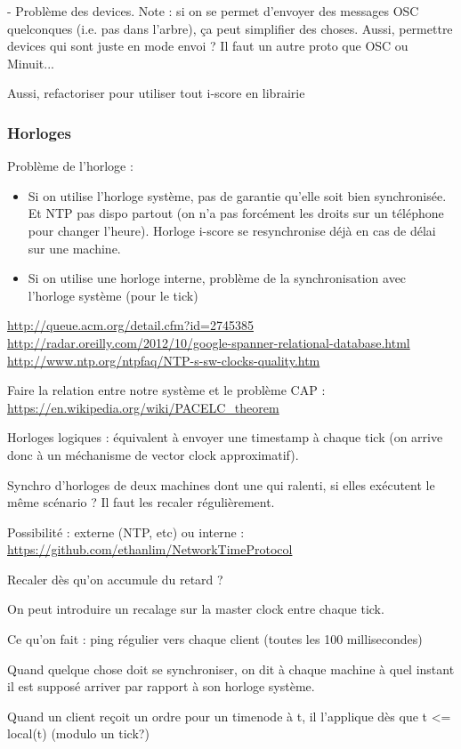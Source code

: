 \documentclass{article}
\begin{document}
- Problème des devices. Note : si on se permet d'envoyer des messages OSC quelconques (i.e. pas dans l'arbre), ça peut simplifier des choses. Aussi, permettre devices qui sont juste en mode envoi ? Il faut un autre proto que OSC ou Minuit...

Aussi, refactoriser pour utiliser tout i-score en librairie

\subsubsection{Horloges}
Problème de l'horloge : 
\begin{itemize}
\item Si on utilise l'horloge système, pas de garantie qu'elle soit bien synchronisée. 
Et NTP pas dispo partout (on n'a pas forcément les droits sur un téléphone pour changer l'heure).
Horloge i-score se resynchronise déjà en cas de délai sur une machine.
\item Si on utilise une horloge interne, problème de la synchronisation avec l'horloge système (pour le tick)
\end{itemize}

\url{http://queue.acm.org/detail.cfm?id=2745385}
\url{http://radar.oreilly.com/2012/10/google-spanner-relational-database.html}
\url{http://www.ntp.org/ntpfaq/NTP-s-sw-clocks-quality.htm}

Faire la relation entre notre système et le problème CAP : \url{https://en.wikipedia.org/wiki/PACELC_theorem}

Horloges logiques : équivalent à envoyer une timestamp à chaque tick (on arrive donc à un méchanisme de vector clock approximatif). 

Synchro d'horloges de deux machines dont une qui ralenti, si elles exécutent le même 
scénario ? Il faut les recaler régulièrement. 

Possibilité : externe (NTP, etc) ou interne : \url{https://github.com/ethanlim/NetworkTimeProtocol}

Recaler dès qu'on accumule du retard ?



On peut introduire un recalage sur la master clock entre chaque tick.

Ce qu'on fait : ping régulier vers chaque client (toutes les 100 millisecondes)

Quand quelque chose doit se synchroniser, on dit à chaque machine à quel instant il est supposé arriver par rapport à son horloge système.

Quand un client reçoit un ordre pour un timenode à t, il l'applique dès que t <= local(t) (modulo un tick?)
\end{document}
